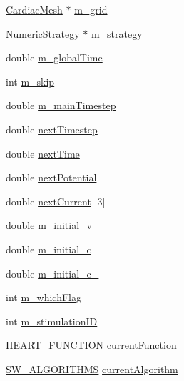 \begin{DoxyCompactItemize}
\item 
\hyperlink{class_cardiac_mesh}{Cardiac\+Mesh} $\ast$ \hyperlink{class_atrial_machine2d_ae5a4568a32980b04648791e7ac5e3249}{m\+\_\+grid}
\item 
\hyperlink{class_numeric_strategy}{Numeric\+Strategy} $\ast$ \hyperlink{class_atrial_machine2d_afa218ce1cafcf45895c0317953b97977}{m\+\_\+strategy}
\item 
double \hyperlink{class_atrial_machine2d_a951f2f5f1bee9505ee93df61121bf5d2}{m\+\_\+global\+Time}
\item 
int \hyperlink{class_atrial_machine2d_a08a7d022fbd6733e52775651b5f139dc}{m\+\_\+skip}
\item 
double \hyperlink{class_atrial_machine2d_a792a54d1811f886bf93f9546aac0120f}{m\+\_\+main\+Timestep}
\item 
double \hyperlink{class_atrial_machine2d_aa279d4e4ab1193bb6c358541d52424ff}{next\+Timestep}
\item 
double \hyperlink{class_atrial_machine2d_a8f3931073e39c8c188d5ca65631b704b}{next\+Time}
\item 
double \hyperlink{class_atrial_machine2d_a50c29aa024f47633087f27e0f70607cf}{next\+Potential}
\item 
double \hyperlink{class_atrial_machine2d_ae037f3658a7c3f9af7e05cd19a0a94b7}{next\+Current} \mbox{[}3\mbox{]}
\item 
double \hyperlink{class_atrial_machine2d_af93ce7ff7615bf27467eb765623c720c}{m\+\_\+initial\+\_\+v}
\item 
double \hyperlink{class_atrial_machine2d_a5ff92394b2f3e615b7c36c8adf7286d6}{m\+\_\+initial\+\_\+c}
\item 
double \hyperlink{class_atrial_machine2d_a14baf4c478ff64494b38eee78955a472}{m\+\_\+initial\+\_\+c\+\_}
\item 
int \hyperlink{class_atrial_machine2d_a74ecd78d3016ae5a6a5c6004aa43ad96}{m\+\_\+which\+Flag}
\item 
int \hyperlink{class_atrial_machine2d_ae73fef18f9b4e2d46689756b1478e025}{m\+\_\+stimulation\+I\+D}
\item 
\hyperlink{heart_defines_8h_a2e6f185296f039d4680b50804849b9d9}{H\+E\+A\+R\+T\+\_\+\+F\+U\+N\+C\+T\+I\+O\+N} \hyperlink{class_atrial_machine2d_a15d1c77b3cd28c073e221905f4cc6493}{current\+Function}
\item 
\hyperlink{heart_defines_8h_ae0e356ca8deebb30aca0cd91e0cbd46c}{S\+W\+\_\+\+A\+L\+G\+O\+R\+I\+T\+H\+M\+S} \hyperlink{class_atrial_machine2d_a57773395f154207dbbac601624586559}{current\+Algorithm}
\end{DoxyCompactItemize}


